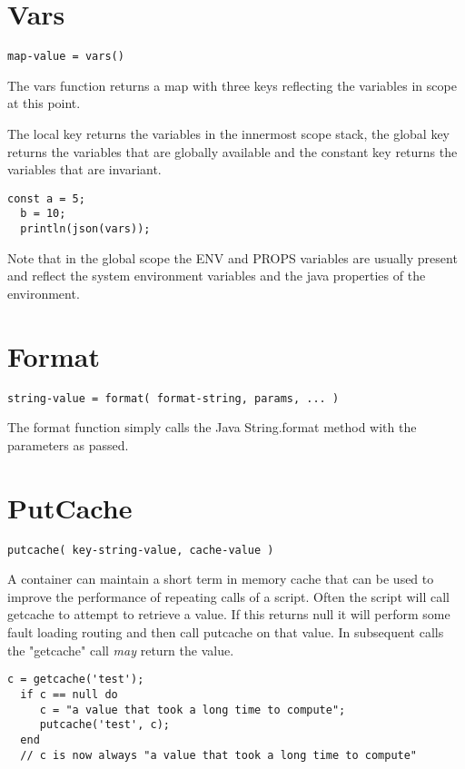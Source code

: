\section{Vars}
\begin{Verbatim}
map-value = vars()
\end{Verbatim}

The vars function returns a map with three keys reflecting the variables in scope at this point.

The local key returns the variables in the innermost scope stack, the global key returns the variables
that are globally available and the constant key returns the variables that are invariant.

\begin{lstlisting}[caption={vars example}]
  const a = 5;
  b = 10;
  println(json(vars));
\end{lstlisting}

Note that in the global scope the ENV and PROPS variables are usually present and reflect the system environment
variables and the java properties of the environment.

\section{Format}
\begin{Verbatim}
string-value = format( format-string, params, ... )
\end{Verbatim}

The format function simply calls the Java String.format method with the parameters
as passed.

\section{PutCache}
\begin{Verbatim}
putcache( key-string-value, cache-value )
\end{Verbatim}

A \Reflex container can maintain a short term in memory cache that can be used
to improve the performance of repeating calls of a script. Often the script will call
getcache to attempt to retrieve a value. If this returns null it will perform some fault loading
routing and then call putcache on that value. In subsequent calls the "getcache" call \emph{may}
return the value.

\begin{lstlisting}[caption={cache example}]
  c = getcache('test');
  if c == null do
     c = "a value that took a long time to compute";
     putcache('test', c);
  end
  // c is now always "a value that took a long time to compute"
\end{lstlisting}

